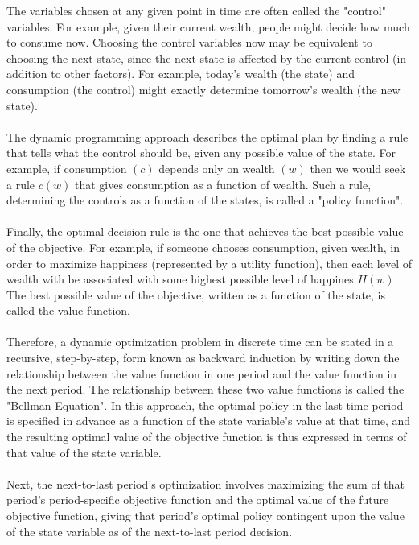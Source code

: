 \documentclass{article}
\begin{document}
The variables chosen at any given point in time are often called the "control" variables. For example, given their current wealth, people might decide how much to consume now. Choosing the control variables now may be equivalent to choosing the next state, since the next state is affected by the current control (in addition to other factors). For example, today's wealth (the state) and consumption (the control) might exactly determine tomorrow's wealth (the new state). \\ \\
The dynamic programming approach describes the optimal plan by finding a rule that tells what the control should be, given any possible value of the state. For example, if consumption $(c)$ depends only on wealth $(w)$ then we would seek a rule $c(w)$ that gives consumption as a function of wealth. Such a rule, determining the controls as a function of the states, is called a "policy function". \\ \\
Finally, the optimal decision rule is the one that achieves the best possible value of the objective. For example, if someone chooses consumption, given wealth, in order to maximize happiness (represented by a utility function), then each level of wealth with be associated with some highest possible level of happines $H(w)$. The best possible value of the objective, written as a function of the state, is called the value function. \\ \\
\vspace{1mm}
Therefore, a dynamic optimization problem in discrete time can be stated in a recursive, step-by-step, form known as backward induction by writing down the relationship between the value function in one period and the value function in the next period. The relationship between these two value functions is called the "Bellman Equation". In this approach, the optimal policy in the last time period is specified in advance as a function of the state variable's value at that time, and the resulting optimal value of the objective function is thus expressed in terms of that value of the state variable. \\ \\
Next, the next-to-last period's optimization involves maximizing the sum of that period's period-specific objective function and the optimal value of the future objective function, giving that period's optimal policy contingent upon the value of the state variable as of the next-to-last period decision. \\ \\
\end{document}
